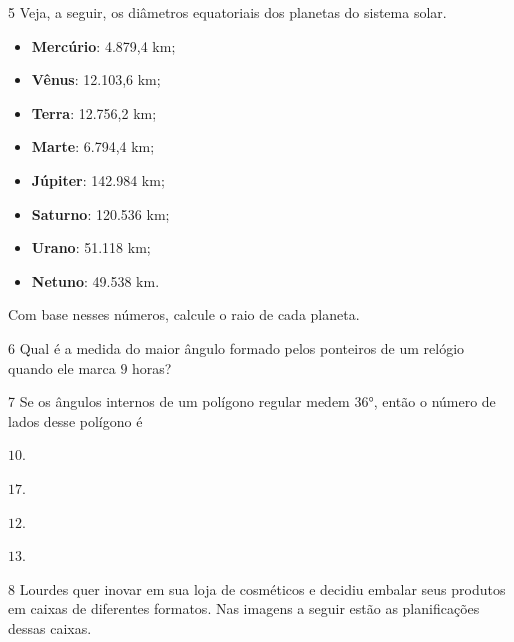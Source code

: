 {{{{

\num{5}  Veja, a seguir, os diâmetros equatoriais dos planetas do sistema
solar.

\begin{myquote}
\begin{itemize}
  \item \textbf{Mercúrio}: 4.879,4 km;
  \item \textbf{Vênus}: 12.103,6 km;
  \item \textbf{Terra}: 12.756,2 km;
  \item \textbf{Marte}: 6.794,4 km;
  \item \textbf{Júpiter}: 142.984 km;
  \item \textbf{Saturno}: 120.536 km;
  \item \textbf{Urano}: 51.118 km;
  \item \textbf{Netuno}: 49.538 km.
\end{itemize}
\end{myquote}

Com base nesses números, calcule o raio de cada planeta.


\num{6}  Qual é a medida do maior ângulo formado pelos ponteiros de um relógio
quando ele marca $9$ horas?


\num{7}  Se os ângulos internos de um polígono regular medem $36$°, então o
número de lados desse polígono é

\begin{escolha}
\item $10$. 
\item $17$.
\item $12$.
\item $13$.
\end{escolha}

\num{8}  Lourdes quer inovar em sua loja de cosméticos e decidiu embalar seus
produtos em caixas de diferentes formatos. Nas imagens a seguir estão as
planificações dessas caixas.

}}}}
